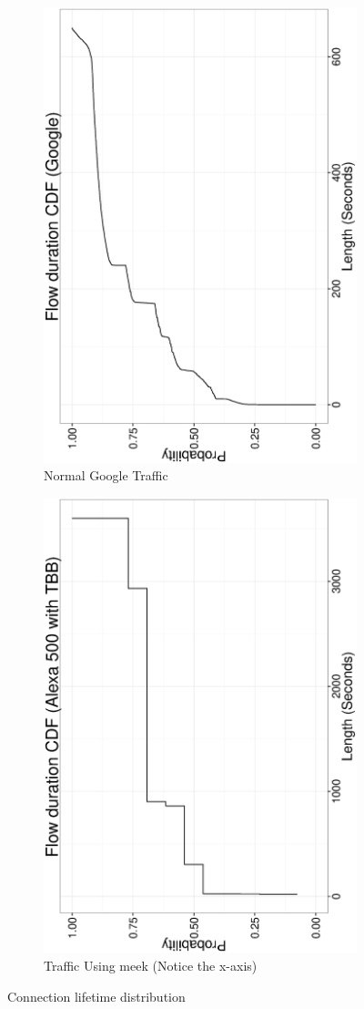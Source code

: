 \documentclass[conference]{IEEEtran}
\begin{document}
\begin{figure}
\centering
\begin{subfigure}[b]{0.5\textwidth}
\includegraphics[height=\textwidth, angle=270]{figs/flowduration-google-cdf.eps}
\caption{Normal Google Traffic}
\label{fig:duration:lbl}
\end{subfigure}%
\begin{subfigure}[b]{0.5\textwidth}
\includegraphics[height=\textwidth, angle=270]{figs/flowduration-tbb-cdf.eps}
\caption{Traffic Using meek (Notice the x-axis)}
\label{fig:duration:meek}
\end{subfigure}

\caption{Connection lifetime distribution}
\label{fig:duration}
\end{figure}
\end{document}
